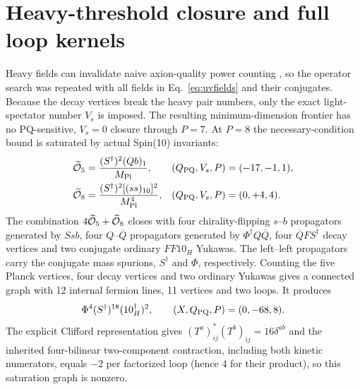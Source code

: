 \documentclass[11pt,a4paper]{article}
\begin{document}
\section{Heavy-threshold closure and full loop kernels}
\label{sec:matching}
Heavy fields can invalidate naive axion-quality power counting
\cite{Bonnefoy}, so the operator search was repeated with all fields in
Eq.~\eqref{eq:uvfields} and their conjugates. Because the decay vertices
break the heavy pair numbers, only the exact light-spectator number $V_s$
is imposed. The resulting minimum-dimension frontier has no PQ-sensitive,
$V_s=0$ closure through $P=7$. At $P=8$ the necessary-condition bound is
saturated by actual Spin(10) invariants:
\begin{align}
 \widetilde{\cal O}_5&=\frac{(S^\dagger)^2(Qb)_1}{M_{\rm Pl}},
 &(Q_{\rm PQ},V_s,P)&=(-17,-1,1),\nonumber\\
 \widetilde{\cal O}_8&=\frac{(S^\dagger)^2
 [(ss)_{10}]^2}{M_{\rm Pl}^4},
 &(Q_{\rm PQ},V_s,P)&=(0,+4,4).
\label{eq:p8ops}
\end{align}
The combination $4\widetilde{\cal O}_5+\widetilde{\cal O}_8$ closes with
four chirality-flipping $s$--$b$ propagators generated by $Ssb$, four
$Q$--$\overline Q$ propagators generated by
$\Phi^\dagger Q\overline Q$, four $\overline QFS^\dagger$ decay vertices
and two conjugate ordinary $FF10_H$ Yukawas. The left--left propagators
carry the conjugate mass spurions, $S^\dagger$ and $\Phi$, respectively.
Counting the five Planck vertices, four decay vertices and two ordinary
Yukawas gives a connected graph with 12 internal fermion lines, 11
vertices and two loops. It produces
\begin{equation}
 \Phi^4(S^\dagger)^{18}(10_H^\dagger)^2,
 \qquad (X,Q_{\rm PQ},P)=(0,-68,8).
\end{equation}
The explicit Clifford representation gives
$(T^a)^*_{ij}(T^b)_{ij}=16\delta^{ab}$ and the inherited four-bilinear
two-component contraction, including both kinetic numerators, equals $-2$
per factorized loop (hence 4 for their product), so this saturation graph
is nonzero.
\end{document}
